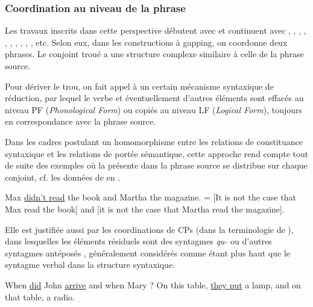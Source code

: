 \subsubsection{Coordination au niveau de la phrase} \label{ch2:sect2.4.1.1}

Les travaux inscrits dans cette perspective débutent avec \citet{Ross1967,Ross1970} et continuent avec \citet{Jackendoff1971}, \citet{Hankamer1973,Hankamer1979}, \citet{Stillings1975}, \citet{Sag1976}, \citet{Neijt1979}, \citet{vanOirsouw1987}, \citet{Wilder1994,Wilder1997}, \citet{AbeEtAl1997,AbeEtAl1999}, \citet{Kim1997}, \citet{Hartmann2000}, etc. Selon eux, dans les constructions à gapping, on coordonne deux phrases. Le conjoint troué a une structure complexe similaire à celle de la phrase source. 

Pour dériver le trou, on fait appel à un certain mécanisme syntaxique de réduction, par lequel le verbe et éventuellement d’autres éléments sont effacés au niveau PF (\textit{Phonological Form}) ou copiés au niveau LF (\textit{Logical Form}), toujours en correspondance avec la phrase source. 

Dans les cadres postulant un homomorphisme entre les relations de constituance syntaxique et les relations de portée sémantique, cette approche rend compte tout de suite des exemples où la  présente dans la phrase source se distribue sur chaque conjoint, cf. les données de \citet{Repp2009} en .

\ea \label{ch2:ex188}
\ea  Max \uline{didn’t read} the book and Martha the magazine.      
\ex  = [It is not the case that Max read the book] and [it is not the case that Martha read the magazine]. 
\z
\z

Elle est justifiée aussi par les coordinations de CPs (dans la terminologie de \citealt{Repp2009}), dans lesquelles les éléments résiduels sont des syntagmes \textit{qu-}  ou d’autres syntagmes antéposés , généralement considérés comme étant plus haut que le syntagme verbal dans la structure syntaxique. 

\ea
\ea  When \uline{did} John \uline{arrive} and when Mary ? \citep[34]{Repp2009} \label{ch2:ex189a}
\ex  On this table, \uline{they put} a lamp, and on that table, a radio. \citep[158]{SagEtAl1985} \label{ch2:ex189b}
\z
\z

